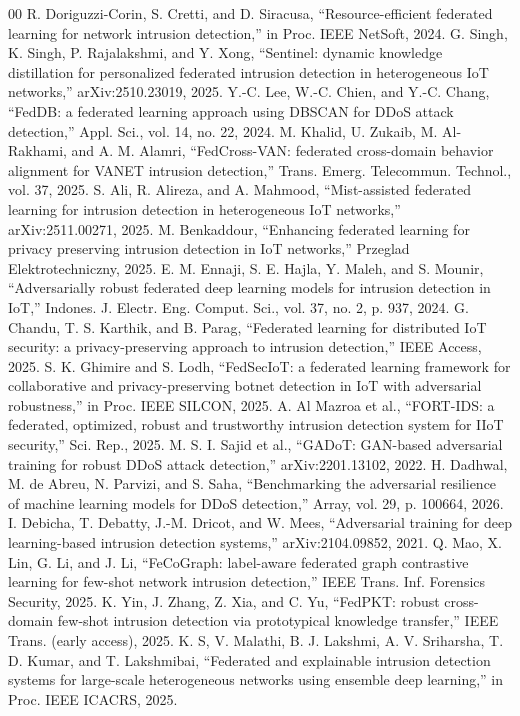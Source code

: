 \documentclass[conference]{IEEEtran}
\begin{document}
\begin{thebibliography}{00}
 R. Doriguzzi-Corin, S. Cretti, and D. Siracusa, ``Resource-efficient federated learning for network intrusion detection,'' in Proc. IEEE NetSoft, 2024.
 G. Singh, K. Singh, P. Rajalakshmi, and Y. Xong, ``Sentinel: dynamic knowledge distillation for personalized federated intrusion detection in heterogeneous IoT networks,'' arXiv:2510.23019, 2025.
 Y.-C. Lee, W.-C. Chien, and Y.-C. Chang, ``FedDB: a federated learning approach using DBSCAN for DDoS attack detection,'' Appl. Sci., vol. 14, no. 22, 2024.
 M. Khalid, U. Zukaib, M. Al-Rakhami, and A. M. Alamri, ``FedCross-VAN: federated cross-domain behavior alignment for VANET intrusion detection,'' Trans. Emerg. Telecommun. Technol., vol. 37, 2025.
 S. Ali, R. Alireza, and A. Mahmood, ``Mist-assisted federated learning for intrusion detection in heterogeneous IoT networks,'' arXiv:2511.00271, 2025.
 M. Benkaddour, ``Enhancing federated learning for privacy preserving intrusion detection in IoT networks,'' Przeglad Elektrotechniczny, 2025.
 E. M. Ennaji, S. E. Hajla, Y. Maleh, and S. Mounir, ``Adversarially robust federated deep learning models for intrusion detection in IoT,'' Indones. J. Electr. Eng. Comput. Sci., vol. 37, no. 2, p. 937, 2024.
 G. Chandu, T. S. Karthik, and B. Parag, ``Federated learning for distributed IoT security: a privacy-preserving approach to intrusion detection,'' IEEE Access, 2025.
 S. K. Ghimire and S. Lodh, ``FedSecIoT: a federated learning framework for collaborative and privacy-preserving botnet detection in IoT with adversarial robustness,'' in Proc. IEEE SILCON, 2025.
 A. Al Mazroa et al., ``FORT-IDS: a federated, optimized, robust and trustworthy intrusion detection system for IIoT security,'' Sci. Rep., 2025.
 M. S. I. Sajid et al., ``GADoT: GAN-based adversarial training for robust DDoS attack detection,'' arXiv:2201.13102, 2022.
 H. Dadhwal, M. de Abreu, N. Parvizi, and S. Saha, ``Benchmarking the adversarial resilience of machine learning models for DDoS detection,'' Array, vol. 29, p. 100664, 2026.
 I. Debicha, T. Debatty, J.-M. Dricot, and W. Mees, ``Adversarial training for deep learning-based intrusion detection systems,'' arXiv:2104.09852, 2021.
 Q. Mao, X. Lin, G. Li, and J. Li, ``FeCoGraph: label-aware federated graph contrastive learning for few-shot network intrusion detection,'' IEEE Trans. Inf. Forensics Security, 2025.
 K. Yin, J. Zhang, Z. Xia, and C. Yu, ``FedPKT: robust cross-domain few-shot intrusion detection via prototypical knowledge transfer,'' IEEE Trans. (early access), 2025.
 K. S, V. Malathi, B. J. Lakshmi, A. V. Sriharsha, T. D. Kumar, and T. Lakshmibai, ``Federated and explainable intrusion detection systems for large-scale heterogeneous networks using ensemble deep learning,'' in Proc. IEEE ICACRS, 2025.
\end{thebibliography}
\end{document}
